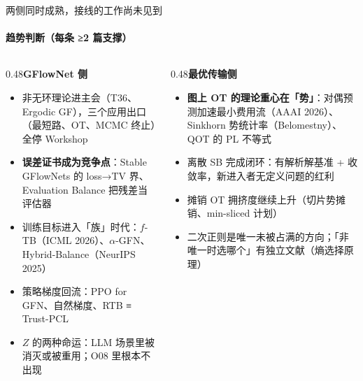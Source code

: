 \documentclass[aspectratio=169,10pt]{beamer}
\newcommand{\pos}[1]{\textcolor{positive}{#1}}
\begin{document}
\begin{frame}{两侧同时成熟，接线的工作尚未见到}\framesubtitle{趋势判断（每条 ≥2 篇支撑）}
\begin{columns}[T]
\begin{column}{0.48\textwidth}\textbf{\pos{GFlowNet 侧}}\vspace{2pt}
{\footnotesize\begin{itemize}
\item 非无环理论进主会（T36、Ergodic GF），三个应用出口（最短路、OT、MCMC 终止）全停 Workshop
\item \textbf{误差证书成为竞争点}：Stable GFlowNets 的 loss→TV 界、Evaluation Balance 把残差当评估器
\item 训练目标进入「族」时代：$f$-TB（ICML 2026）、$\alpha$-GFN、Hybrid-Balance（NeurIPS 2025）
\item 策略梯度回流：PPO for GFN、自然梯度、RTB ≡ Trust-PCL
\item $Z$ 的两种命运：LLM 场景里被消灭或被重用；O08 里根本不出现
\end{itemize}}\end{column}
\hfill
\begin{column}{0.48\textwidth}\textbf{\pos{最优传输侧}}\vspace{2pt}
{\footnotesize\begin{itemize}
\item \textbf{图上 OT 的理论重心在「势」}：对偶预测加速最小费用流（AAAI 2026）、Sinkhorn 势统计率（Belomestny）、QOT 的 PL 不等式
\item 离散 SB 完成闭环：有解析解基准 + 收敛率，新进入者无定义问题的红利
\item 摊销 OT 拥挤度继续上升（切片势摊销、min-sliced 计划）
\item 二次正则是唯一未被占满的方向；「非唯一时选哪个」有独立文献（熵选择原理）
\end{itemize}}\end{column}
\end{columns}
\end{frame}
\end{document}
